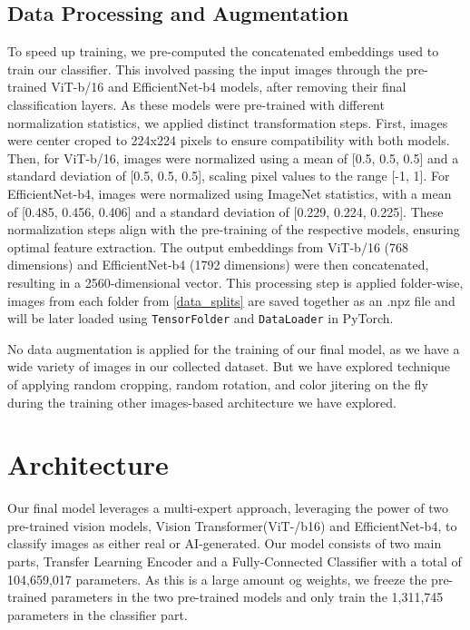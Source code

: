 \documentclass{article} %
\begin{document}
\subsection{Data Processing and Augmentation}

To speed up training, we pre-computed the concatenated embeddings used to train our classifier. This involved passing the input images through the pre-trained ViT-b/16 and EfficientNet-b4 models, after removing their final classification layers. As these models were pre-trained with different normalization statistics, we applied distinct transformation steps. First, images were center croped to 224x224 pixels to ensure compatibility with both models. Then, for ViT-b/16, images were normalized using a mean of [0.5, 0.5, 0.5] and a standard deviation of [0.5, 0.5, 0.5], scaling pixel values to the range [-1, 1]. For EfficientNet-b4, images were normalized using ImageNet statistics, with a mean of [0.485, 0.456, 0.406] and a standard deviation of [0.229, 0.224, 0.225]. These normalization steps align with the pre-training of the respective models, ensuring optimal feature extraction. The output embeddings from ViT-b/16 (768 dimensions) and EfficientNet-b4 (1792 dimensions) were then concatenated, resulting in a 2560-dimensional vector. This processing step is applied folder-wise, images from each folder from \ref{data_splits} are saved together as an .npz file and will be later loaded using \texttt{TensorFolder} and \texttt{DataLoader} in PyTorch.

No data augmentation is applied for the training of our final model, as we have a wide variety of images in our collected dataset. But we have explored technique of applying random cropping, random rotation, and color jitering on the fly during the training other images-based architecture we have explored.

\section{Architecture}
\label{arch}

Our final model leverages a multi-expert approach, leveraging  the power of two pre-trained vision models, Vision Transformer(ViT-/b16) and EfficientNet-b4, to classify images as either real or AI-generated. Our model consists of two main parts, Transfer Learning Encoder and a Fully-Connected Classifier with a total of 104,659,017 parameters. As this is a large amount og weights, we  freeze the pre-trained parameters in the two pre-trained models and only train the 1,311,745 parameters in the classifier part.
\end{document}
